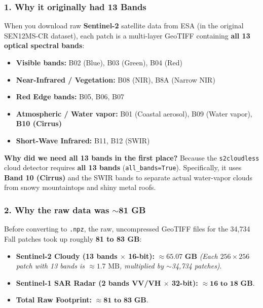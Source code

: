 \documentclass[11pt,a4paper]{article}
\begin{document}
\subsubsection*{1. Why it originally had 13 Bands}
When you download raw \textbf{Sentinel-2} satellite data from ESA (in the original SEN12MS-CR dataset), each patch is a multi-layer GeoTIFF containing \textbf{all 13 optical spectral bands}:
\begin{itemize}[leftmargin=1.5em]
    \item \textbf{Visible bands:} B02 (Blue), B03 (Green), B04 (Red)
    \item \textbf{Near-Infrared / Vegetation:} B08 (NIR), B8A (Narrow NIR)
    \item \textbf{Red Edge bands:} B05, B06, B07
    \item \textbf{Atmospheric / Water vapor:} B01 (Coastal aerosol), B09 (Water vapor), \textbf{B10 (Cirrus)}
    \item \textbf{Short-Wave Infrared:} B11, B12 (SWIR)
\end{itemize}
\textbf{Why did we need all 13 bands in the first place?} Because the \texttt{s2cloudless} cloud detector requires \textbf{all 13 bands} (\texttt{all\_bands=True}). Specifically, it uses \textbf{Band 10 (Cirrus)} and the SWIR bands to separate actual water-vapor clouds from snowy mountaintops and shiny metal roofs.

\subsubsection*{2. Why the raw data was $\sim$81 GB}
Before converting to \texttt{.npz}, the raw, uncompressed GeoTIFF files for the 34,734 Fall patches took up roughly \textbf{81 to 83 GB}:
\begin{itemize}[leftmargin=1.5em]
    \item \textbf{Sentinel-2 Cloudy (13 bands $\times$ 16-bit):} $\approx \mathbf{65.07\text{ GB}}$ \textit{(Each $256 \times 256$ patch with 13 bands is $\approx 1.7\text{ MB}$, multiplied by $\sim$34,734 patches)}.
    \item \textbf{Sentinel-1 SAR Radar (2 bands VV/VH $\times$ 32-bit):} $\approx \mathbf{16\text{ to }18\text{ GB}}$.
    \item \textbf{Total Raw Footprint:} $\approx \mathbf{81\text{ to }83\text{ GB}}$.
\end{itemize}
\end{document}
